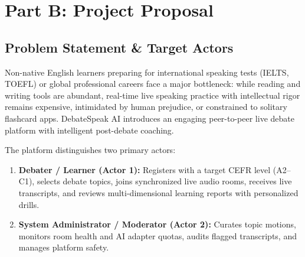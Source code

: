 \documentclass[11pt,a4paper]{article}
\begin{document}
\newpage

\section{Part B: Project Proposal}
\subsection{Problem Statement \& Target Actors}
Non-native English learners preparing for international speaking tests (IELTS, TOEFL) or global professional careers face a major bottleneck: while reading and writing tools are abundant, real-time live speaking practice with intellectual rigor remains expensive, intimidated by human prejudice, or constrained to solitary flashcard apps. DebateSpeak AI introduces an engaging peer-to-peer live debate platform with intelligent post-debate coaching.

The platform distinguishes two primary actors:
\begin{enumerate}[leftmargin=1.2cm]
    \item \textbf{Debater / Learner (Actor 1):} Registers with a target CEFR level (A2--C1), selects debate topics, joins synchronized live audio rooms, receives live transcripts, and reviews multi-dimensional learning reports with personalized drills.
    \item \textbf{System Administrator / Moderator (Actor 2):} Curates topic motions, monitors room health and AI adapter quotas, audits flagged transcripts, and manages platform safety.
\end{enumerate}
\end{document}
